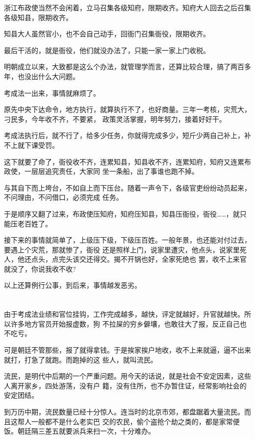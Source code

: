 \documentclass[11pt,a4paper,onecolumn]{article}
\begin{document}
浙江布政使当然不会闲着，立马召集各级知府，限期收齐。知府大人回去之后召集各级知县，限期收齐。

知县大人虽然官小，也不会自己动手，回衙门召集衙役，限期收齐。

最后干活的，就是衙役，他们就没办法了，只能一家一家上门收税。

明朝成立以来，大致都是这么个办法，就管理学而言，还算比较合理，搞了两百多年，也没出什么大问题。

考成法一出来，事情就麻烦了。

原先中央下达命令，地方执行，就算执行不了，也好商量。三年一考核，灾荒大，刁民多，今年收不齐，不要紧，
政策灵活掌握，明年努力，接着好好干。

考成法执行后，就不行了，给多少任务，你就得完成多少，短斤少两自己补上，补不上就下课受罚。

这下就要了命了，衙役收不齐，连累知县，知县收不齐，连累知府，知府又连累布政使，一层层追究责任，大家同
坐一条船，出了事谁也跑不掉。

与其自下而上垮台，不如自上而下压台。随着一声令下，各级官吏纷纷动员起来，不问理由，不问借口，必须完成
任务。

于是顺序又翻了过来，布政使压知府，知府压知县，知县压衙役，衙役……，就只能压老百姓了。

接下来的事情就简单了，上级压下级，下级压百姓。一般年景，也还能对付过去，要遇上个灾荒，那就惨了，衙役
还是照样上门，说家里遭灾，他点头，说家里死人，他还点头，点完头该交还得交。揭不开锅也好，全家死绝也
罢，收不上来官就没了，你说我收不收?

以上还算例行公事，到后来，事情越发恶劣。

\section[\thesection]{}

由于考成法业绩和官位挂钩，工作完成越多，越快，评定就越好，升官就越快。所以许多地方官员开始报虚数，狗
不拉屎的穷乡僻壤，也敢往大了报，反正自己也不吃亏。

可是朝廷不管那些，报了就得拿钱。于是挨家挨户地收，收不上来就逼，逼不出来就打，打急了就跑。而跑掉的这
些人，就叫流民。

流民，是明代中后期的一个严重问题。用今天的话说，就是社会不安定因素，这些人离开家乡，四处游荡，没有户
籍，没有住所，也不办暂住证，经常影响社会的安定团结。

到万历中期，流民数量已经十分惊人。连当时的北京市郊，都盘踞着大量流民。而且这帮人一般都不是什么老实巴
交的农民，偷个盗抢个劫之类的，都是家常便饭。朝廷隔三差五就要派兵来扫一次，十分难办。
\end{document}
